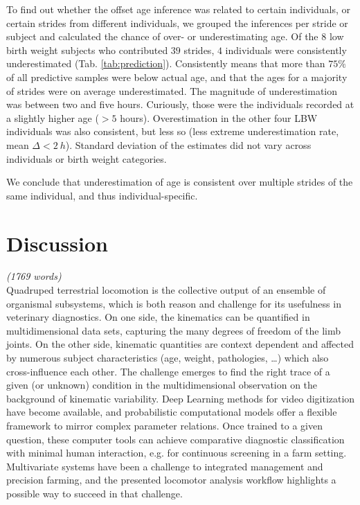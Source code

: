 \documentclass[10pt,a4paper]{article}
\begin{document}
To find out whether the offset age inference was related to certain individuals, or certain strides from different individuals, we grouped the inferences per stride or subject and calculated the chance of over- or underestimating age.
Of the
\(8\)
low birth weight subjects who contributed
\(39\)
strides,
\(4\)
individuals were consistently underestimated (Tab. \ref{tab:prediction}).
Consistently means that more than \(75 \%\) of all predictive samples were below actual age, and that the ages for a majority of strides were on average underestimated.
The magnitude of underestimation was between two and five hours.
Curiously, those were the individuals recorded at a slightly higher age (\(> 5\) hours).
Overestimation in the other four LBW individuals was also consistent, but less so (less extreme underestimation rate, mean \(\Delta < 2\ h\)).
Standard deviation of the estimates did not vary across individuals or birth weight categories.

We conclude that underestimation of age is consistent over multiple strides of the same individual, and thus individual-specific.

\FloatBarrier
\clearpage
\section{Discussion}
\label{discussion}
\emph{(1769 words)\\\empty
}
Quadruped terrestrial locomotion is the collective output of an ensemble of organismal subsystems, which is both reason and challenge for its usefulness in veterinary diagnostics.
On one side, the kinematics can be quantified in multidimensional data sets, capturing the many degrees of freedom of the limb joints.
On the other side, kinematic quantities are context dependent and affected by numerous subject characteristics (age, weight, pathologies, \ldots{}) which also cross-influence each other.
The challenge emerges to find the right trace of a given (or unknown) condition in the multidimensional observation on the background of kinematic variability.
Deep Learning methods for video digitization have become available, and probabilistic computational models offer a flexible framework to mirror complex parameter relations.
Once trained to a given question, these computer tools can achieve comparative diagnostic classification with minimal human interaction, e.g. for continuous screening in a farm setting.
Multivariate systems have been a challenge to integrated management and precision farming, and the presented locomotor analysis workflow highlights a possible way to succeed in that challenge.
\end{document}
